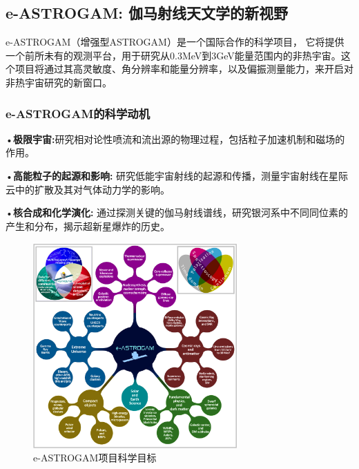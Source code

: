 \subsection{e-ASTROGAM: 伽马射线天文学的新视野}
e-ASTROGAM（增强型ASTROGAM）是一个国际合作的科学项目，
    它将提供一个前所未有的观测平台，用于研究从0.3MeV到3GeV能量范围内的非热宇宙。这个项目将通过其高灵敏度、角分辨率和能量分辨率，以及偏振测量能力，来开启对
    非热宇宙研究的新窗口。

\subsubsection{e-ASTROGAM的科学动机}
•\textbf{极限宇宙:}研究相对论性喷流和流出源的物理过程，包括粒子加速机制和磁场的作用。\par
•\textbf{高能粒子的起源和影响: }研究低能宇宙射线的起源和传播，测量宇宙射线在星际云中的扩散及其对气体动力学的影响。\par
•\textbf{核合成和化学演化: }通过探测关键的伽马射线谱线，研究银河系中不同同位素的产生和分布，揭示超新星爆炸的历史。\par
\begin{figure}[H] %
	\centering %
	\includegraphics[width=0.7\textwidth]{figures/e-ASTROGAM项目可视化.png} %
	\caption{e-ASTROGAM项目科学目标} %
\end{figure}
